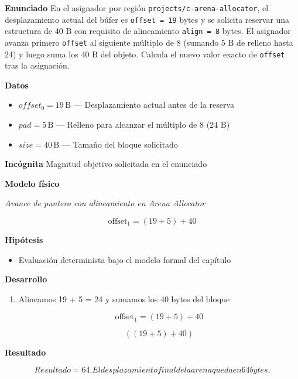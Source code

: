 \documentclass{book}
\begin{document}
\begin{tcolorbox}[title={Problema resuelto}, studiumworked, breakable]

\noindent\textbf{Enunciado}
En el asignador por región \texttt{projects/c-arena-allocator}, el desplazamiento actual del búfer es \texttt{offset = 19} bytes y se solicita reservar una estructura de \(40\text{ B}\) con requisito de alineamiento \texttt{align = 8} bytes. El asignador avanza primero \texttt{offset} al siguiente múltiplo de 8 (sumando \(5\text{ B}\) de relleno hasta \(24\)) y luego suma los \(40\text{ B}\) del objeto. Calcula el nuevo valor exacto de \texttt{offset} tras la asignación.

\noindent\textbf{Datos}
\begin{itemize}
\item $offset_{0} = 19\,\mathrm{B}$ — Desplazamiento actual antes de la reserva
\item $pad = 5\,\mathrm{B}$ — Relleno para alcanzar el múltiplo de 8 (24 B)
\item $size = 40\,\mathrm{B}$ — Tamaño del bloque solicitado
\end{itemize}

\noindent\textbf{Incógnita}
Magnitud objetivo solicitada en el enunciado

\noindent\textbf{Modelo físico}

\noindent\textit{Avance de puntero con alineamiento en Arena Allocator}

\[
\text{offset}_1 = (19 + 5) + 40
\]

\noindent\textbf{Hipótesis}
\begin{itemize}
\item Evaluación determinista bajo el modelo formal del capítulo
\end{itemize}

\noindent\textbf{Desarrollo}
\begin{enumerate}
\item
Alineamos 19 + 5 = 24 y sumamos los 40 bytes del bloque

\[
\text{offset}_1 = (19 + 5) + 40
\]

\[
\left(\left(19+5\right)+40\right)
\]
\end{enumerate}

\noindent\textbf{Resultado}

\[
Resultado = 64. El desplazamiento final de la arena queda en 64 bytes.
\]


\end{tcolorbox}
\end{document}
